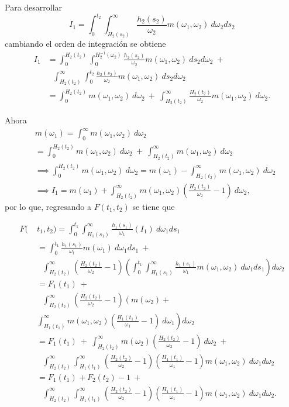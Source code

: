 \documentclass[11pt,a4paper]{article}
\begin{document}
\begin{appendices}
Para desarrollar $$I_1 = \int_0^{t_2} \int_{H_2(s_2)}^\infty \frac{h_2(s_2)}{\omega_2} m(\omega_1, \omega_2) \ d\omega_2 ds_2$$ cambiando el orden de integración se obtiene
\begin{align*}
I_1 &= \int_0^{H_2(t_2)}\int_0^{H_2^{-1}(\omega_2)} \frac{h_2(s_2)}{\omega_2}m(\omega_1, \omega_2) \ ds_2 d\omega_2 \ +\\
& \ \ \ \int_{H_2(t_2)}^\infty \int_0^{t_2} \frac{h_2(s_2)}{\omega_2}m(\omega_1, \omega_2) \ ds_2 d\omega_2\\
&= \int_0^{H_2(t_2)} m(\omega_1, \omega_2) \ d\omega_2 \ + \ \int_{H_2(t_2)}^\infty \frac{H_2(t_2)}{\omega_2}m(\omega_1, \omega_2) \ d\omega_2.
\end{align*}

Ahora
\begin{align*}
&m(\omega_1) = \int_0^\infty m(\omega_1, \omega_2) \ d\omega_2\\
&= \int_0^{H_2(t_2)} m(\omega_1, \omega_2) \ d\omega_2 \ + \ \int_{H_2(t_2)}^\infty m(\omega_1, \omega_2) \ d\omega_2\\
&\implies \int_0^{H_2(t_2)} m(\omega_1, \omega_2) \ d\omega_2 = m(\omega_1) - \int_{H_2(t_2)}^\infty m(\omega_1, \omega_2) \ d\omega_2\\
&\implies I_1 = m(\omega_1) + \int_{H_2(t_2)}^\infty m(\omega_1, \omega_2) \left( \frac{H_2(t_2)}{\omega_2}-1\right) \ d\omega_2,
\end{align*}
por lo que, regresando a $F(t_1, t_2)$ se tiene que

\begin{align*}
F(&t_1, t_2) = \int_0^{t_1} \int_{H_1(s_1)}^\infty \frac{h_1(s_1)}{\omega_1}\left( I_1 \right) \ d\omega_1 ds_1\\
&= \int_0^{t_1} \frac{h_1(s_1)}{\omega_1}m(\omega_1) \ d\omega_1 ds_1 \ +\\ & \ \ \ \int_{H_2(t_2)}^\infty \left(\frac{H_2(t_2)}{\omega_2}-1 \right) \left(\int_0^{t_1}\int_{H_1(s_1)}^\infty \frac{h_1(s_1)}{\omega_1}m(\omega_1, \omega_2) \ d\omega_1 ds_1 \right) d\omega_2\\
&= F_1(t_1) \ + \\
& \ \ \ \int_{H_2(t_2)}^\infty \left(\frac{H_2(t_2)}{\omega_2}-1 \right)\left(m(\omega_2) + \right.\\
\ \ \ \ \ \ &\left.  \int_{H_1(t_1)}^\infty m(\omega_1, \omega_2) \left(\frac{H_1(t_1)}{\omega_1}-1 \right) \ d\omega_1 \right) d\omega_2\\
&= F_1(t_1) \ + \ \int_{H_2(t_2)}^\infty m(\omega_2) \left( \frac{H_2(t_2)}{\omega_2}-1 \right) \ d\omega_2 \ +\\
& \ \ \ \int_{H_2(t_2)}^\infty\int_{H_1(t_1)}^\infty \left(\frac{H_2(t_2)}{\omega_2}-1\right)\left(\frac{H_1(t_1)}{\omega_1}-1\right) m(\omega_1, \omega_2) \ d\omega_1 d\omega_2\\
&= F_1(t_1) + F_2(t_2) - 1 \ +\\
& \ \ \ \int_{H_2(t_2)}^\infty\int_{H_1(t_1)}^\infty \left(\frac{H_2(t_2)}{\omega_2}-1\right)\left(\frac{H_1(t_1)}{\omega_1}-1\right) m(\omega_1, \omega_2) \ d\omega_1 d\omega_2.
\end{align*}


\end{appendices}
\end{document}
